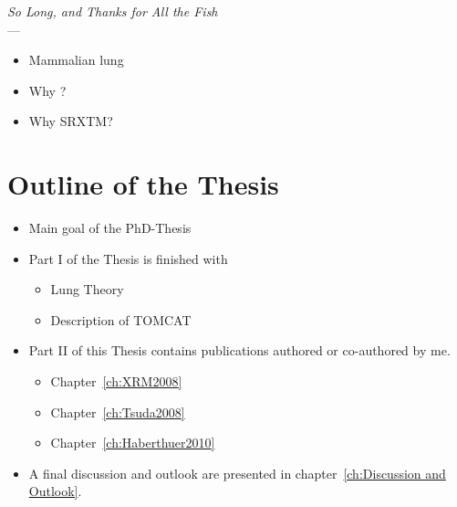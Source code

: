 \label{ch:Introduction}
\begin{flushright}{\slshape    
		So Long, and Thanks for All the Fish} \\ \medskip
    ---  \citep{Adams1984}
\end{flushright}
\begin{itemize}
	\item Mammalian lung
	\item Why \threed ?
	\item Why \ac{SRXTM}?
\end{itemize}

\section{Outline of the Thesis}
\begin{itemize}
	\item Main goal of the PhD-Thesis
	\item Part I of the Thesis is finished with 
	\begin{itemize}
		\item Lung Theory
		\item Description of TOMCAT
	\end{itemize}
	\item Part II of this Thesis contains publications authored or co-authored by me.
	\begin{itemize}
		\item Chapter~\ref{ch:XRM2008}
		\item Chapter~\ref{ch:Tsuda2008}
		\item Chapter~\ref{ch:Haberthuer2010}
	\end{itemize}
	\item A final discussion and outlook are presented in chapter~\ref{ch:Discussion and Outlook}.
\end{itemize}